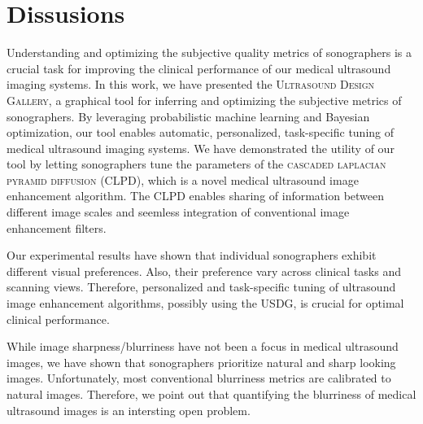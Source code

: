 
\section{Dissusions}\label{section:conclusion}
Understanding and optimizing the subjective quality metrics of sonographers is a crucial task for improving the clinical performance of our medical ultrasound imaging systems.
In this work, we have presented the \textsc{Ultrasound Design Gallery}, a graphical tool for inferring and optimizing the subjective metrics of sonographers.
By leveraging probabilistic machine learning and Bayesian optimization, our tool enables automatic, personalized, task-specific tuning of medical ultrasound imaging systems.
We have demonstrated the utility of our tool by letting sonographers tune the parameters of the \textsc{cascaded laplacian pyramid diffusion} (CLPD), which is a novel medical ultrasound image enhancement algorithm.
The CLPD enables sharing of information between different image scales and seemless integration of conventional image enhancement filters.

Our experimental results have shown that individual sonographers exhibit different visual preferences.
Also, their preference vary across clinical tasks and scanning views.
Therefore, personalized and task-specific tuning of ultrasound image enhancement algorithms, possibly using the USDG, is crucial for optimal clinical performance.

While image sharpness/blurriness have not been a focus in medical ultrasound images, we have shown that sonographers prioritize natural and sharp looking images.
Unfortunately, most conventional blurriness metrics are calibrated to natural images.
Therefore, we point out that quantifying the blurriness of medical ultrasound images is an intersting open problem.

